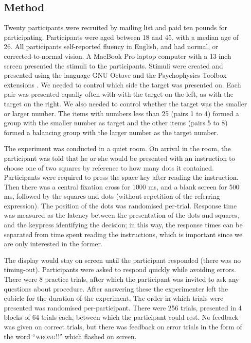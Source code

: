\documentclass[
a4paper 
, doc
, longtable
]{apa6}
\begin{document}
\subsection{Method}
Twenty participants were recruited by mailing list and paid ten pounds for participating. Participants were aged between 18 and 45, with a median age of 26. All participants self-reported fluency in English, and had normal, or corrected-to-normal vision. A MacBook Pro laptop computer with a 13 inch screen presented the stimuli to the participants. Stimuli were created and presented using the language GNU Octave \cite{eaton:2002} and the Psychophysics Toolbox extensions \cite{ptbx1, ptbx2}. We needed to control which side the target was presented on. Each pair was presented equally often with with the target on the left, as with the target on the right. We also needed to control whether the target was the smaller or larger number. The items with numbers less than 25 (pairs 1 to 4) formed a group with the smaller number as target and the other items (pairs 5 to 8) formed a balancing group with the larger number as the target number.

The experiment was conducted in a quiet room. On arrival in the room, the participant was told that he or she would be presented with an instruction to choose one of two squares by reference to how many dots it contained. Participants were required to press the space key after reading the instruction. Then there was a central fixation cross for 1000 ms, and a blank screen for 500 ms, followed by the squares and dots (without repetition of the referring expression).  The position of the dots was randomised per-trial. Response time was measured as the latency between the presentation of the dots and squares, and the keypress identifying the decision; in this way, the response times can be separated from time spent reading the instructions, which is important since we are only interested in the former.

The display would stay on screen until the participant responded (there was no timing-out). Participants were asked to respond quickly while avoiding errors. There were 8 practice trials, after which the participant was invited to ask any questions about procedure. After answering these the experimenter left the cubicle for the duration of the experiment. The order in which trials were presented was randomised per-participant. There were 256 trials, presented in 4 blocks of 64 trials each, between which the participant could rest. No feedback was given on correct trials, but there was feedback on error trials in the form of the word ``\textsc{wrong!!}'' which flashed on screen.
\end{document}
